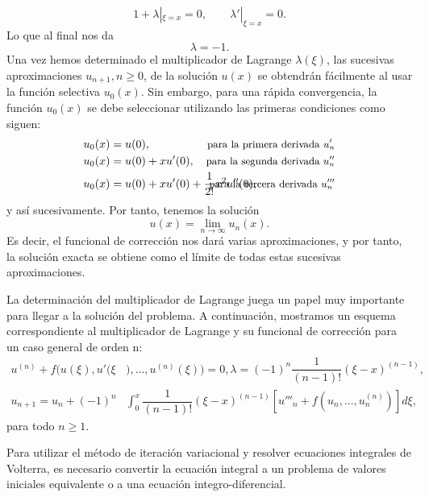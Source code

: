 \begin{equation}
	1 + \lambda |_{\xi = x} = 0, \qquad \lambda'|_{\xi = x} = 0.
\end{equation}
Lo que al final nos da
\begin{equation}
	\lambda = -1.
\end{equation}
Una vez hemos determinado el multiplicador de Lagrange $\lambda(\xi)$, las sucesivas aproximaciones $u_{n+1}, n \geqslant 0$, de la solución $u(x)$ se obtendrán fácilmente al usar la función selectiva $u_0(x)$. Sin embargo, para una rápida convergencia, la función $u_0(x)$ se debe seleccionar utilizando las primeras condiciones como siguen:
\begin{align}
	u_0(x) &= u(0),  \shorteqnote{para la primera derivada $u'_n$}  &   \\
	u_0(x) &= u(0) + xu'(0),  \shorteqnote{para la segunda derivada $u''_n$}  &   \\
	u_0(x) &= u(0) + xu'(0) + \dfrac{1}{2!}x^2u''(0), \qquad \qquad \qquad \shorteqnote{para la tercera derivada $u'''_n$}
\end{align}
y así sucesivamente. Por tanto, tenemos la solución 
\begin{equation}
	u(x) = \lim_{n\rightarrow \infty} u_n(x).
\end{equation}
Es decir, el funcional de corrección nos dará varias aproximaciones, y por tanto, la solución exacta se obtiene como el límite de todas estas sucesivas aproximaciones.

La determinación del multiplicador de Lagrange juega un papel muy importante para llegar a la solución del problema. A continuación, mostramos un esquema correspondiente al multiplicador de Lagrange y su funcional de corrección para un caso general de orden n:
	\begin{align}
	u^{(n)} + f(u(\xi),u'(\xi&),...,u^{(n)}(\xi)) = 0, \lambda = (-1)^n\dfrac{1}{(n-1)!}(\xi - x)^{(n-1)},      &   \\
	u_{n+1} = u_n + (-1)^n & \int_{0}^{x} \dfrac{1}{(n-1)!}(\xi - x)^{(n-1)}[u'''_n + f(u_n,...,u^{(n)}_n)]d\xi,    &
\end{align}
para todo $n \geqslant 1$.

Para utilizar el método de iteración variacional y resolver ecuaciones integrales de Volterra, es necesario convertir la ecuación integral a un problema de valores iniciales equivalente o a una ecuación integro-diferencial.

